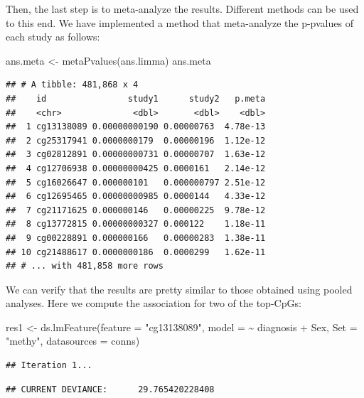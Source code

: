 \documentclass[
]{book}
\newenvironment{Shaded}{\begin{snugshade}}{\end{snugshade}}
\newcommand{\AttributeTok}[1]{\textcolor[rgb]{0.77,0.63,0.00}{#1}}
\newcommand{\FunctionTok}[1]{\textcolor[rgb]{0.00,0.00,0.00}{#1}}
\newcommand{\NormalTok}[1]{#1}
\newcommand{\OtherTok}[1]{\textcolor[rgb]{0.56,0.35,0.01}{#1}}
\newcommand{\SpecialCharTok}[1]{\textcolor[rgb]{0.00,0.00,0.00}{#1}}
\newcommand{\StringTok}[1]{\textcolor[rgb]{0.31,0.60,0.02}{#1}}
\begin{document}
Then, the last step is to meta-analyze the results. Different methods can be used to this end. We have implemented a method that meta-analyze the p-pvalues of each study as follows:

\begin{Shaded}
\begin{Highlighting}[]
\NormalTok{ans.meta }\OtherTok{\textless{}{-}} \FunctionTok{metaPvalues}\NormalTok{(ans.limma)}
\NormalTok{ans.meta}
\end{Highlighting}
\end{Shaded}

\begin{verbatim}
## # A tibble: 481,868 x 4
##    id                study1      study2   p.meta
##    <chr>              <dbl>       <dbl>    <dbl>
##  1 cg13138089 0.00000000190 0.00000763  4.78e-13
##  2 cg25317941 0.0000000179  0.00000196  1.12e-12
##  3 cg02812891 0.00000000731 0.00000707  1.63e-12
##  4 cg12706938 0.00000000425 0.0000161   2.14e-12
##  5 cg16026647 0.000000101   0.000000797 2.51e-12
##  6 cg12695465 0.00000000985 0.0000144   4.33e-12
##  7 cg21171625 0.000000146   0.00000225  9.78e-12
##  8 cg13772815 0.00000000327 0.000122    1.18e-11
##  9 cg00228891 0.000000166   0.00000283  1.38e-11
## 10 cg21488617 0.0000000186  0.0000299   1.62e-11
## # ... with 481,858 more rows
\end{verbatim}

We can verify that the results are pretty similar to those obtained using pooled analyses. Here we compute the association for two of the top-CpGs:

\begin{Shaded}
\begin{Highlighting}[]
\NormalTok{res1 }\OtherTok{\textless{}{-}} \FunctionTok{ds.lmFeature}\NormalTok{(}\AttributeTok{feature =} \StringTok{"cg13138089"}\NormalTok{, }
                     \AttributeTok{model =} \SpecialCharTok{\textasciitilde{}}\NormalTok{ diagnosis }\SpecialCharTok{+}\NormalTok{ Sex, }
                     \AttributeTok{Set =} \StringTok{"methy"}\NormalTok{,}
                     \AttributeTok{datasources =}\NormalTok{ conns)}
\end{Highlighting}
\end{Shaded}

\begin{verbatim}
## Iteration 1...
\end{verbatim}

\begin{verbatim}
## CURRENT DEVIANCE:      29.765420228408
\end{verbatim}
\end{document}
